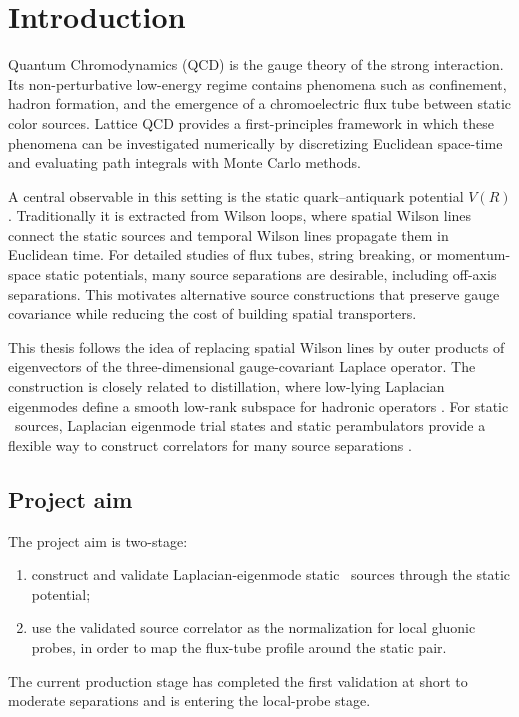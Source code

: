 \chapter{Introduction}
\label{chap:introduction}

Quantum Chromodynamics (QCD) is the gauge theory of the strong interaction. Its non-perturbative low-energy regime contains phenomena such as confinement, hadron formation, and the emergence of a chromoelectric flux tube between static color sources. Lattice QCD provides a first-principles framework in which these phenomena can be investigated numerically by discretizing Euclidean space-time and evaluating path integrals with Monte Carlo methods.

A central observable in this setting is the static quark--antiquark potential \(V(R)\). Traditionally it is extracted from Wilson loops, where spatial Wilson lines connect the static sources and temporal Wilson lines propagate them in Euclidean time. For detailed studies of flux tubes, string breaking, or momentum-space static potentials, many source separations are desirable, including off-axis separations. This motivates alternative source constructions that preserve gauge covariance while reducing the cost of building spatial transporters.

This thesis follows the idea of replacing spatial Wilson lines by outer products of eigenvectors of the three-dimensional gauge-covariant Laplace operator. The construction is closely related to distillation, where low-lying Laplacian eigenmodes define a smooth low-rank subspace for hadronic operators \cite{Peardon2009}. For static \QQbar\ sources, Laplacian eigenmode trial states and static perambulators provide a flexible way to construct correlators for many source separations \cite{Hoellwieser2023}.

\section{Project aim}
The project aim is two-stage:
\begin{enumerate}
  \item construct and validate Laplacian-eigenmode static \QQbar\ sources through the static potential;
  \item use the validated source correlator as the normalization for local gluonic probes, in order to map the flux-tube profile around the static pair.
\end{enumerate}
The current production stage has completed the first validation at short to moderate separations and is entering the local-probe stage.


